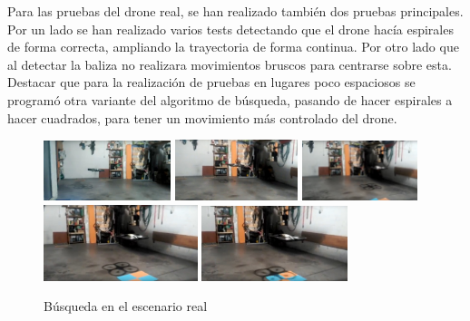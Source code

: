 \hspace{1cm} Para las pruebas del drone real, se han realizado tambi\'en dos pruebas principales. Por un lado se han realizado varios tests detectando que el drone hac\'ia espirales de forma correcta, ampliando la trayectoria de forma continua. Por otro lado que al detectar la baliza no realizara movimientos bruscos para centrarse sobre esta. Destacar que para la realizaci\'on de pruebas en lugares poco espaciosos se program\'o otra variante del algoritmo de b\'usqueda, pasando de hacer espirales a hacer cuadrados, para tener un movimiento m\'as controlado del drone. 


\begin{figure}[H]
 \centering
    \includegraphics[width=0.33\textwidth]{imgs/busqueda_real1.jpg}
    \includegraphics[width=0.32\textwidth]{imgs/busqueda_real3.jpg}
    \includegraphics[width=0.30\textwidth]{imgs/busqueda_real5.jpg}\\
    \includegraphics[width=0.4\textwidth]{imgs/busqueda_real6.jpg}
    \includegraphics[width=0.38\textwidth]{imgs/busqueda_real7.jpg}
 \caption{B\'usqueda en el escenario real}
 \label{f:Busqueda con el drone real}
\end{figure}


